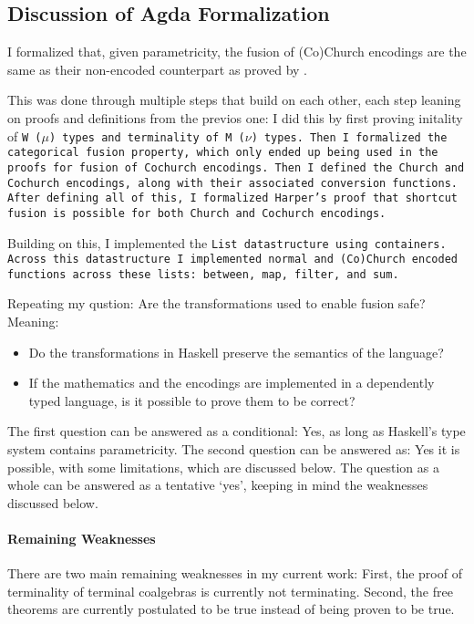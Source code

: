 \subsection{Discussion of Agda Formalization}\label{sec:agda_form_disc}
I formalized that, given parametricity, the fusion of (Co)Church encodings are the same as their non-encoded counterpart as proved by \cite{Harper2011}.

This was done through multiple steps that build on each other, each step leaning on proofs and definitions from the previos one:
I did this by first proving initality of \tt{W} ($\mu$) types and terminality of \tt{M} ($\nu$) types.
Then I formalized the categorical fusion property, which only ended up being used in the proofs for fusion of Cochurch encodings.
Then I defined the Church and Cochurch encodings, along with their associated conversion functions.
After defining all of this, I formalized Harper's proof that shortcut fusion is possible for both Church and Cochurch encodings.

Building on this, I implemented the \tt{List} datastructure using containers.
Across this datastructure I implemented normal and (Co)Church encoded functions across these lists: \tt{between}, \tt{map}, \tt{filter}, and \tt{sum}.

Repeating my qustion:
Are the transformations used to enable fusion safe? Meaning:
\begin{itemize}[noitemsep]
  \item Do the transformations in Haskell preserve the semantics of the language?
  \item If the mathematics and the encodings are implemented in a dependently typed language, is it possible to prove them to be correct?
\end{itemize}
The first question can be answered as a conditional: Yes, as long as Haskell's type system contains parametricity.
The second question can be answered as: Yes it is possible, with some limitations, which are discussed below.
The question as a whole can be answered as a tentative `yes', keeping in mind the weaknesses discussed below.


\paragraph{Remaining Weaknesses}
There are two main remaining weaknesses in my current work:
First, the proof of terminality of terminal coalgebras is currently not terminating.
Second, the free theorems are currently postulated to be true instead of being proven to be true.

